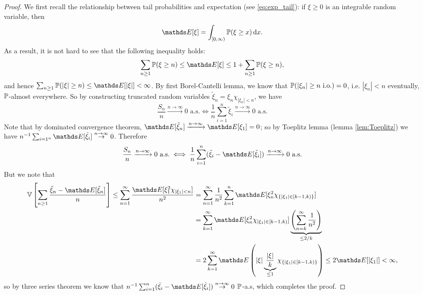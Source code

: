 \begin{proof}
We first recall the relationship between tail probabilities and expectation (see \eqref{eq:exp_tail}): if $\xi\geq 0$ is an integrable random variable, then
\begin{equation}
    \E[\xi] = \int_{[0,\infty)}\p(\xi \ge x) \, \d x.
\end{equation}
As a result, it is not hard to see that the following inequality holds:
\begin{equation}
\sum_{n\geq 1} \p(\xi \geq n) \leq \E[\xi] \leq 1+\sum_{n\geq 1} \p(\xi \geq n),
\end{equation}
and hence $\sum_{n\geq 1} \p(|\xi| \geq n) \leq \E[|\xi|] < \infty$. By first Borel-Cantelli lemma, we know that $\mathbb{P}(|\xi_n| \geq n \text{ i.o.}) = 0$, i.e. $|\xi_n|< n$ eventually, $\mathbb{P}$-almost everywhere. So by constructing truncated random variables $\tilde{\xi}_n = \xi_n\chi_{|\xi_n| < n}$, we have 
\begin{equation*}
    \frac{S_n}{n} \xrightarrow{n\to\infty} 0 \text{ a.s.} \iff \frac{1}{n} \sum_{i=1}^n \tilde{\xi}_i \xrightarrow{n\to\infty} 0 \text{ a.s.}
\end{equation*}
Note that by dominated convergence theorem, $\E[\tilde{\xi}_n] \xrightarrow{n\to\infty} \E[\xi_1] = 0$; so by Toeplitz lemma (lemma \ref{lem:Toeplitz}) we have $n^{-1} \sum_{i=1^n} \E[\tilde{\xi}_i] \overset{n\to\infty}{\to} 0$. Therefore
\begin{equation*}
    \frac{S_n}{n} \xrightarrow{n\to\infty} 0 \text{ a.s.} \iff \frac{1}{n} \sum_{i=1}^n (\tilde{\xi}_i - \E[\tilde{\xi}_i]) \xrightarrow{n\to\infty} 0 \text{ a.s.}
\end{equation*}
But we note that 
\begin{align*}
    \V\sqbracket{\sum_{n\geq 1} \frac{\tilde{\xi}_n - \E[\tilde{\xi}_n]}{n}} \leq  \sum_{n=1}^\infty \frac{\E[\xi_1^2 \chi_{|\xi_1| < n}]}{n^2}
    &= \sum_{n=1}^\infty \frac{1}{n^2} \sum_{k=1}^n \E[\xi_n^2 \chi_{\set{|\xi_1| \in [k-1,k)}}] \\
    &= \sum_{k=1}^\infty \E[\xi_n^2 \chi_{|\xi_1| \in [k-1,k)}] \underbrace{\bracket{\sum_{n=k}^\infty \frac{1}{n^2}}}_{\leq 2/k} \\
    &= 2\sum_{k=1}^\infty \E\bracket{|\xi| \underbrace{\frac{|\xi|}{k}}_{\leq 1} \chi_{\set{|\xi_1| \in [k-1,k)}}} \leq 2\E[|\xi_1|] < \infty,
\end{align*}
so by three series theorem we know that $n^{-1} \sum_{i=1}^n (\tilde{\xi}_i - \E[\tilde{\xi}_i]) \overset{n\to\infty}\to 0$ $\mathbb{P}$-a.s, which completes the proof.
\end{proof}

